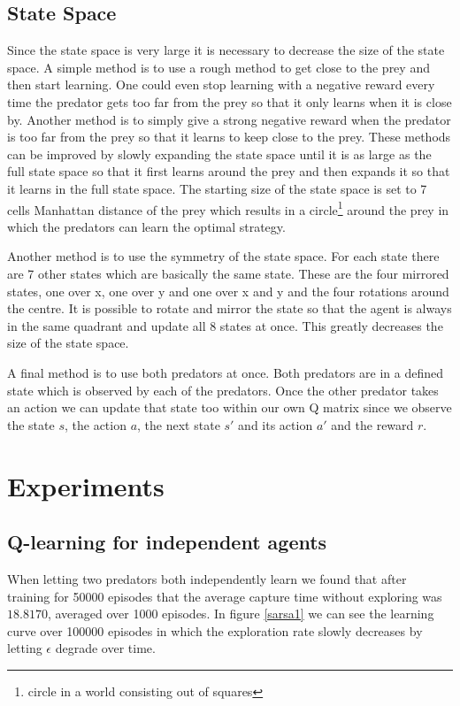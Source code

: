 \documentclass[10pt]{article}
\begin{document}
\subsection{State Space}
Since the state space is very large it is necessary to decrease the size of the state space. A simple method is to use a rough method to get close to the prey and then start learning. One could even stop learning with a negative reward every time the predator gets too far from the prey so that it only learns when it is close by. Another method is to simply give a strong negative reward when the predator is too far from the prey so that it learns to keep close to the prey. These methods can be improved by slowly expanding the state space until it is as large as the full state space so that it first learns around the prey and then expands it so that it learns in the full state space. The starting size of the state space is set to 7 cells Manhattan distance of the prey which results in a circle\footnote{circle in a world consisting out of squares} around the prey in which the predators can learn the optimal strategy.

Another method is to use the symmetry of the state space. For each state there are 7 other states which are basically the same state. These are the four mirrored states, one over x, one over y and one over x and y and the four rotations around the centre. It is possible to rotate and mirror the state so that the agent is always in the same quadrant and update all 8 states at once. This greatly decreases the size of the state space.

A final method is to use both predators at once. Both predators are in a defined state which is observed by each of the predators. Once the other predator takes an action we can update that state too within our own Q matrix since we observe the state $s$, the action $a$, the next state $s'$ and its action $a'$ and the reward $r$.


\section{Experiments}\label{experiments}
\subsection{Q-learning for independent agents}
When letting two predators both independently learn we found that after training for 50000 episodes that the average capture time without exploring was $18.8170$, averaged over 1000 episodes. In figure \ref{sarsa1} we can see the learning curve over 100000 episodes in which the exploration rate slowly decreases by letting $\epsilon$ degrade over time.
\end{document}
